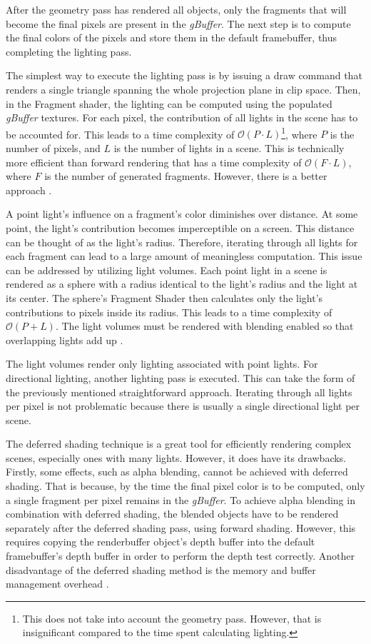 \documentclass[
  digital,     %
  oneside,     %
  nosansbold,  %
  nocolorbold, %
  lof,         %
  lot,         %
]{fithesis4}
\begin{document}
After the geometry pass has rendered all objects, only the fragments that will become
the final pixels are present in the \emph{gBuffer}. The next step is to compute the final colors of the pixels
and store them in the default framebuffer, thus completing the lighting pass.

The simplest way to execute the lighting pass is by issuing a draw command that renders a single triangle
spanning the whole projection plane in clip space. Then, in the Fragment shader, the lighting can be computed
using the populated \emph{gBuffer} textures. For each pixel, the contribution
of all lights in the scene has to be accounted for. This leads to a time complexity of $\mathcal{O}(P\cdot L)$\footnote{This
does not take into account the geometry pass. However, that is insignificant compared to the time spent calculating lighting.},
where $P$ is the number of pixels, and $L$ is the number of lights in a scene. This is technically
more efficient than forward rendering that has a time complexity of $\mathcal{O}(F\cdot L)$, where $F$
is the number of generated fragments. However, there is a better approach \cite{learnopengl-deferred}.

A point light's influence on a fragment's color diminishes over distance. At some point, the light's
contribution becomes imperceptible on a screen. This distance can be thought of as the light's radius.
Therefore, iterating through all lights for each fragment can lead to a large amount of meaningless computation.
This issue can be addressed by utilizing light volumes. Each point light in a scene is rendered as a sphere
with a radius identical to the light's radius and the light at its center. The sphere's Fragment Shader
then calculates only the light's contributions to pixels inside its radius. This leads
to a time complexity of $\mathcal{O}(P + L)$. The light
volumes must be rendered with blending enabled so that overlapping lights add up \cite{learnopengl-deferred}.

The light volumes render only lighting associated with point lights. For directional lighting,
another lighting pass is executed. This can take the form of the previously mentioned straightforward approach.
Iterating through all lights per pixel is not problematic because there is usually a single directional light per scene.

The deferred shading technique is a great tool for efficiently rendering complex scenes, especially
ones with many lights. However, it does have its drawbacks.
Firstly, some effects, such as alpha blending, cannot be achieved with deferred shading. That is because, by the time
the final pixel color is to be computed, only a single fragment per pixel remains in the \emph{gBuffer}. To achieve
alpha blending in combination with deferred shading, the blended objects have to be rendered separately after
the deferred shading pass, using forward shading. However, this requires copying the renderbuffer object's depth
buffer into the default framebuffer's depth buffer in order to perform the depth test correctly. Another
disadvantage of the deferred shading method is the memory and buffer management overhead \cite{learnopengl-deferred}.
\end{document}
